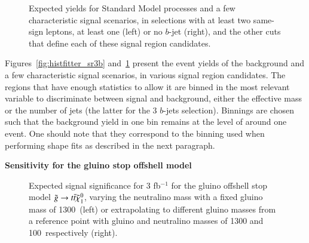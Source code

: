 \begin{figure}[htb!]
\centering
{}
\caption{Expected yields for Standard Model processes and a few characteristic signal scenarios, 
in selections with at least two same-sign leptons, at least one (left) or no $b$-jet (right), and the other cuts that define each of these signal region candidates. 
}
\label{fig:histfitter_sr0and1b}
\end{figure}


Figures~\ref{fig:histfitter_sr3b} and~\ref{fig:histfitter_sr0and1b} present the event yields of the background and a few characteristic signal scenarios, 
in various signal region candidates. The regions that have enough statistics to allow it are binned in the most relevant 
variable to discriminate between signal and background, either the effective mass or the number of jets (the latter for the 3 $b$-jets selection). 
Binnings are chosen such that the background yield in one bin remains at the level of around one event. 
One should note that they correspond to the binning used when performing shape fits as described in the next paragraph. 
\\
\par{\bf Sensitivity for the gluino stop offshell model\\}

\begin{figure}[htb!]
\centering
{}
\caption{Expected signal significance for 3 fb$^{-1}$ for the gluino offshell stop model $\tilde{g} \rightarrow t\bar{t}\tilde{\chi}_{1}^{0}$, 
varying the neutralino mass with a fixed gluino mass of 1300~\GeV (left) 
or extrapolating to different gluino masses from a reference point with gluino and neutralino masses of 1300 and 100~\GeV respectively (right). }
\label{fig:signif_gtt}
\end{figure}

